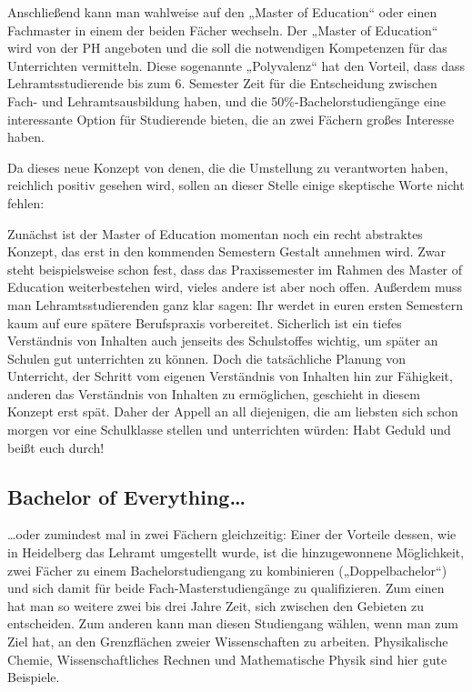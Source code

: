 Anschließend kann man wahlweise auf den „Master of Education“ oder einen Fachmaster in einem der beiden Fächer wechseln. Der „Master of Education“ wird von der PH angeboten und die soll die notwendigen Kompetenzen für das Unterrichten vermitteln. Diese sogenannte „Polyvalenz“ hat den Vorteil, dass dass Lehramtsstudierende bis zum 6. Semester Zeit für die Entscheidung zwischen Fach- und Lehramtsausbildung haben, und die 50\%-Bachelorstudiengänge eine interessante Option für Studierende bieten, die an zwei Fächern großes Interesse haben.

Da dieses neue Konzept von denen, die die Umstellung zu verantworten haben, reichlich positiv gesehen wird, sollen an dieser Stelle einige skeptische Worte nicht fehlen:

Zunächst ist der Master of Education momentan noch ein recht abstraktes Konzept, das erst in den kommenden Semestern Gestalt annehmen wird. Zwar steht beispielsweise schon fest, dass das Praxissemester im Rahmen des Master of Education weiterbestehen wird, vieles andere ist aber noch offen. Außerdem muss man Lehramtsstudierenden ganz klar sagen: Ihr werdet in euren ersten Semestern kaum auf eure spätere Berufspraxis vorbereitet. Sicherlich ist ein tiefes Verständnis von Inhalten auch jenseits des Schulstoffes wichtig, um später an Schulen gut unterrichten zu können. Doch die tatsächliche Planung von Unterricht, der Schritt vom eigenen Verständnis von Inhalten hin zur Fähigkeit, anderen das Verständnis von Inhalten zu ermöglichen, geschieht in diesem Konzept erst spät. Daher der Appell an all diejenigen, die am liebsten sich schon morgen vor eine Schulklasse stellen und unterrichten würden: Habt Geduld und beißt euch durch!

\subsection{Bachelor of Everything\dots}

\dots oder zumindest mal in zwei Fächern gleichzeitig: Einer der Vorteile dessen, wie in Heidelberg das Lehramt umgestellt wurde, ist die hinzugewonnene Möglichkeit, zwei Fächer zu einem Bachelorstudiengang zu kombinieren („Doppelbachelor“) und sich damit für beide Fach-Mas\-ter\-stu\-di\-en\-gän\-ge zu qualifizieren. Zum einen hat man so weitere zwei bis drei Jahre Zeit, sich zwischen den Gebieten zu entscheiden. Zum anderen kann man diesen Studiengang wählen, wenn man zum Ziel hat, an den Grenzflächen zweier Wissenschaften zu arbeiten. Physikalische Chemie, Wissenschaftliches Rechnen und Mathematische Physik sind hier gute Beispiele.

